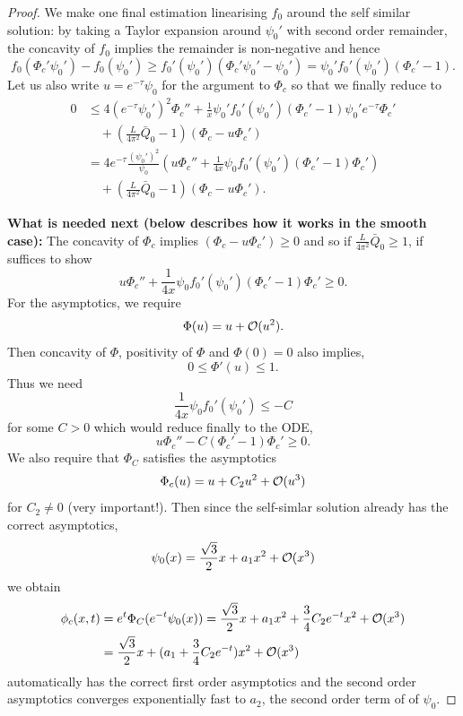 \documentclass[11pt]{amsart}
\begin{document}
\begin{proof}
We make one final estimation linearising $f_0$ around the self similar solution: by taking a Taylor expansion around $\psi_0'$ with second order remainder, the concavity of $f_0$ implies the remainder is non-negative and hence
\[
f_0(\Phi_c' \psi_0') - f_0(\psi_0') \geq f_0'(\psi_0')(\Phi_c'\psi_0' - \psi_0') = \psi_0' f_0'(\psi_0')(\Phi_c' - 1).
\]
Let us also write $u = e^{-\tau} \psi_0$ for the argument to $\Phi_c$ so that we finally reduce to
\begin{equation}
\label{eq:Phi}
\begin{split}
0 &\leq 4 (e^{-\tau} \psi_0')^2 \Phi_c'' + \frac{1}{x} \psi_0' f_0'(\psi_0')(\Phi_c' - 1) \psi_0' e^{-\tau} \Phi_c' \\
&\quad + \left(\frac{L}{4\pi^2} \bar{Q}_0 - 1\right) \left(\Phi_c - u \Phi_c'\right) \\
&= 4 e^{-\tau} \frac{(\psi_0')^2}{\psi_0} \left(u \Phi_c'' + \frac{1}{4x} \psi_0 f_0'(\psi_0')(\Phi_c' - 1) \Phi_c'\right) \\
&\quad + \left(\frac{L}{4\pi^2} \bar{Q}_0 - 1\right) \left(\Phi_c - u \Phi_c'\right).
\end{split}
\end{equation}

\textbf{What is needed next (below describes how it works in the smooth case):}
The concavity of $\Phi_c$ implies $\left(\Phi_c - u \Phi_c'\right) \geq 0$ and so if $\frac{L}{4\pi^2} \bar{Q}_0 \geq 1$, if suffices to show
\[
u \Phi_c'' + \frac{1}{4x} \psi_0 f_0'(\psi_0')(\Phi_c' - 1) \Phi_c' \geq 0.
\]
For the asymptotics, we require
\[
\Phi(u) = u + \operatorname{\mathcal{O}}(u^2).
\]
Then concavity of $\Phi$, positivity of $\Phi$ and $\Phi(0) = 0$ also implies,
\[
0 \leq \Phi'(u) \leq 1.
\]
Thus we need
\[
\frac{1}{4x} \psi_0 f_0'(\psi_0') \leq -C
\]
for some $C > 0$ which would reduce finally to the ODE,
\begin{equation}
\label{eq:comparison_ode}
u \Phi_c'' - C (\Phi_c' - 1) \Phi_c' \geq 0.
\end{equation}
We also require that $\Phi_C$ satisfies the asymptotics
\begin{equation}
\label{eq:comparison_asymptotics}
\Phi_c(u) = u + C_2 u^2 + \operatorname{\mathcal{O}}(u^3)
\end{equation}
for $C_2 \ne 0$ (very important!). Then since the self-simlar solution already has the correct asymptotics,
\[
\psi_0(x) = \frac{\sqrt{3}}{2} x + a_1 x^2 + \operatorname{\mathcal{O}}(x^3)
\]
we obtain
\[
\begin{split}
\phi_c(x, t) &= e^t \Phi_C (e^{-t} \psi_0(x)) = \frac{\sqrt{3}}{2} x + a_1 x^2 + \frac{3}{4} C_2 e^{-t} x^2 + \operatorname{\mathcal{O}}(x^3) \\
& =  \frac{\sqrt{3}}{2} x + (a_1  + \frac{3}{4} C_2 e^{-t}) x^2 + \operatorname{\mathcal{O}}(x^3)
\end{split}
\]
automatically has the correct first order asymptotics and the second order asymptotics converges exponentially fast to $a_2$, the second order term of of $\psi_0$.
\end{proof}
\end{document}
